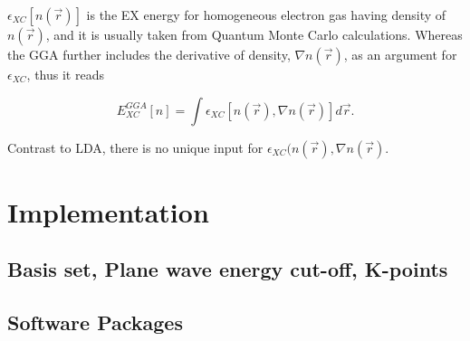 $\epsilon_{XC}[n(\vec{r})]$ is the EX energy for homogeneous electron gas having density of $n(\vec{r})$, and it is usually taken from Quantum Monte Carlo calculations. Whereas the GGA further includes the derivative of density, $\nabla n(\vec{r})$, as an argument for $\epsilon_{XC}$, thus it reads

\begin{equation}
E_{XC}^{GGA}[n]=\int \epsilon_{XC}[n(\vec{r}),\nabla n(\vec{r})]d\vec{r}.
\end{equation}

Contrast to LDA, there is no unique input for $\epsilon_{XC}(n(\vec{r}),\nabla n(\vec{r})$. 

\section{Implementation}
\subsection{Basis set, Plane wave energy cut-off, K-points}
\subsection{Software Packages}